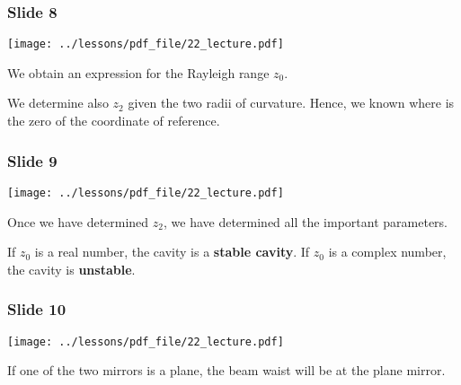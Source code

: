 \documentclass[../main/main.tex]{subfiles}
\begin{document}
\subsubsection*{Slide 8}

\begin{minipage}[]{0.5\linewidth}
\centering
\texttt{[image: ../lessons/pdf\_file/22\_lecture.pdf]}
\end{minipage}
\hspace{0.3cm}\vspace{0.3cm}
\begin{minipage}[c]{0.47\linewidth}

We obtain an expression for the Rayleigh range \( z_0 \).

We determine also \( z_2 \) given the two radii of curvature. Hence, we known where is the zero of the coordinate of reference.

\end{minipage}

\subsubsection*{Slide 9}

\begin{minipage}[]{0.5\linewidth}
\centering
\texttt{[image: ../lessons/pdf\_file/22\_lecture.pdf]}
\end{minipage}
\hspace{0.3cm}\vspace{0.3cm}
\begin{minipage}[c]{0.47\linewidth}

Once we have determined \( z_2 \), we have determined all the important parameters.

If \( z_0 \) is a real number, the cavity is a \textbf{stable cavity}. If \( z_0 \) is a complex number, the cavity is \textbf{unstable}.

\end{minipage}

\subsubsection*{Slide 10}

\begin{minipage}[]{0.5\linewidth}
\centering
\texttt{[image: ../lessons/pdf\_file/22\_lecture.pdf]}
\end{minipage}
\hspace{0.3cm}\vspace{0.3cm}
\begin{minipage}[c]{0.47\linewidth}

If one of the two mirrors is a plane, the beam waist will be at the plane mirror.

\end{minipage}
\end{document}
